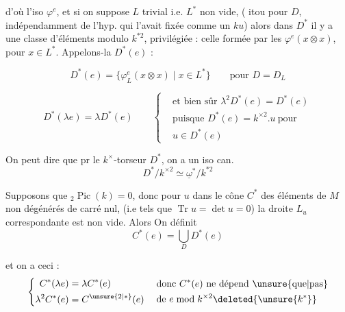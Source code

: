 d'où l'iso $\varphi^e$, et si on suppose $L$ trivial i.e. $L^*$ non vide,  ( itou pour $D$, indépendamment  de l'hyp. qui l'avait fixée comme un $ku$) alors dans $D^*$ il y a une classe d'éléments modulo $k^{*2}$, privilégiée : celle formée par les $\varphi^e(x\otimes x)$, pour $x\in L^*$. Appelons-la $D^*(e)$ : 

\[
 D^*(e)=\{\varphi_L^e(x\otimes x)\mid x\in L^*\}\qquad \text{pour }D=D_L
\]

\[
 D^*(\lambda e)=\lambda D^*(e)\qquad
 \left\{\begin{aligned}
 &\text{et bien sûr }\lambda^2D^*(e)=D^*(e)\\
 &\text{puisque }D^*(e)=k^{\times2}.u\ \text{pour}\\
 &u\in D^*(e)
 \end{aligned}\right.
\]

 On peut dire que pr le $k^\times$-torseur $D^*$, on a un iso can.
\[
 D^*/k^{\times2}\simeq\underline{\omega}^*/k^{*2}
\]

 Supposons que $ {}_2\operatorname{Pic}(k)=0$, donc pour   $u$ dans le cône $C^*$ des éléments de $M$ non dégénérés de carré nul, (i.e tels que $\operatorname{Tr}u=\det u=0$) la droite $L_u$ correspondante est non vide. Alors On définit 
\[
 C^*(e)=\bigcup_D D^*(e)
\]

et on a ceci :
\[
 \left\{\begin{aligned}
 C^*(\lambda e)&=\lambda C^*(e)\\
 \lambda^2 C^*(e)&=C^{\unsure{2|*}}(e)
 \end{aligned}\right.\quad
 \begin{aligned}
 &\text{donc }C^*(e)\ \text{ne dépend \unsure{que|pas}}\\
 &\text{de }e\bmod k^{\times2}\deleted{\unsure{k^*}}
 \end{aligned}
\]

